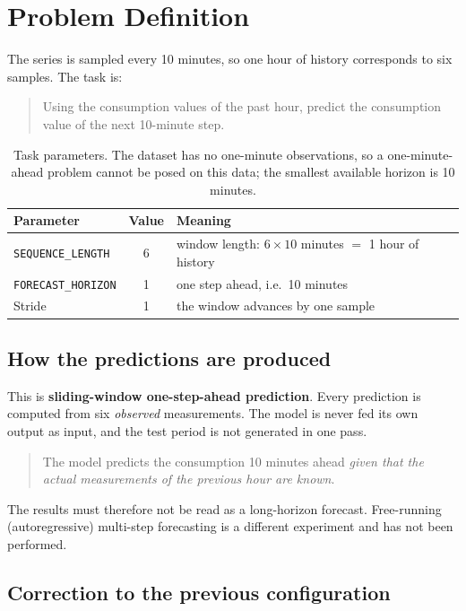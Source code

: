 \documentclass[11pt,a4paper]{article}
\begin{document}
\section{Problem Definition}
\label{sec:problem}

The series is sampled every 10 minutes, so one hour of history corresponds to six samples. The
task is:

\begin{quote}
Using the consumption values of the past hour, predict the consumption value of the next
10-minute step.
\end{quote}

\begin{table}[H]
\centering
\begin{tabular}{lcl}
\toprule
\textbf{Parameter} & \textbf{Value} & \textbf{Meaning} \\
\midrule
\texttt{SEQUENCE\_LENGTH}  & 6 & window length: $6 \times 10$ minutes $=$ 1 hour of history \\
\texttt{FORECAST\_HORIZON} & 1 & one step ahead, i.e.\ 10 minutes \\
Stride                     & 1 & the window advances by one sample \\
\bottomrule
\end{tabular}
\caption{Task parameters. The dataset has no one-minute observations, so a one-minute-ahead
problem cannot be posed on this data; the smallest available horizon is 10 minutes.}
\end{table}

\subsection{How the predictions are produced}

This is \textbf{sliding-window one-step-ahead prediction}. Every prediction is computed from six
\emph{observed} measurements. The model is never fed its own output as input, and the test period
is not generated in one pass.

\begin{quote}
The model predicts the consumption 10 minutes ahead \emph{given that the actual measurements of
the previous hour are known}.
\end{quote}

\noindent
The results must therefore not be read as a long-horizon forecast. Free-running (autoregressive)
multi-step forecasting is a different experiment and has not been performed.

\subsection{Correction to the previous configuration}
\end{document}

